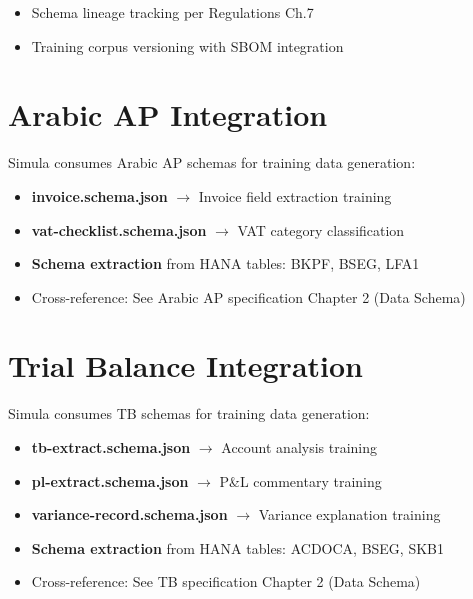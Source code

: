 \documentclass[12pt,a4paper,twoside]{report}
\begin{document}
\begin{itemize}
\item Schema lineage tracking per Regulations Ch.7
\item Training corpus versioning with SBOM integration
\end{itemize}

\section{Arabic AP Integration}
\label{sec:arabic-integration}

Simula consumes Arabic AP schemas for training data generation:

\begin{itemize}
\item \textbf{invoice.schema.json} $\rightarrow$ Invoice field extraction training
\item \textbf{vat-checklist.schema.json} $\rightarrow$ VAT category classification
\item \textbf{Schema extraction} from HANA tables: BKPF, BSEG, LFA1
\item Cross-reference: See Arabic AP specification Chapter 2 (Data Schema)
\end{itemize}

\section{Trial Balance Integration}
\label{sec:tb-integration}

Simula consumes TB schemas for training data generation:

\begin{itemize}
\item \textbf{tb-extract.schema.json} $\rightarrow$ Account analysis training
\item \textbf{pl-extract.schema.json} $\rightarrow$ P\&L commentary training
\item \textbf{variance-record.schema.json} $\rightarrow$ Variance explanation training
\item \textbf{Schema extraction} from HANA tables: ACDOCA, BSEG, SKB1
\item Cross-reference: See TB specification Chapter 2 (Data Schema)
\end{itemize}

\end{document}
